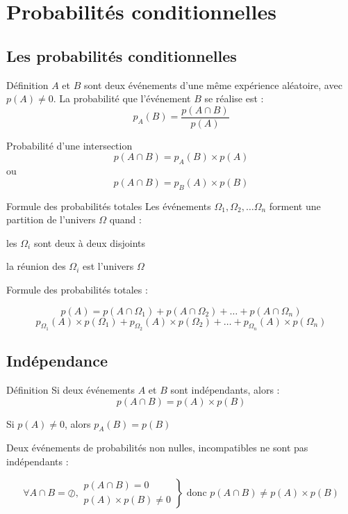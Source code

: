 \section{Probabilités conditionnelles}

\subsection{Les probabilités conditionnelles}
\begin{bclogo}{Définition}
$A$ et $B$ sont deux événements d'une même expérience aléatoire, avec $p(A)\neq 0$. La probabilité que l'événement $B$ se réalise est : \[p_A(B)=\frac{p(A\cap B)}{p(A)}\]
\end{bclogo}

\medskip

\begin{bclogo}{Probabilité d'une intersection}
\[p(A\cap B)=p_A(B)\times p(A)\]
ou
\[p(A\cap B)=p_B(A)\times p(B)\]
\end{bclogo}

\medskip

\begin{bclogo}{Formule des probabilités totales}
Les événements $\Omega_1, \Omega_2,\ldots\Omega_n$ forment une partition de l'univers $\Omega$ quand :

les $\Omega_i$ sont deux à deux disjoints

la réunion des $\Omega_i$ est l'univers $\Omega$

Formule des probabilités totales :

\[p(A)=p(A\cap \Omega_1)+p(A\cap \Omega_2)+\ldots+p(A\cap \Omega_n)\]
\[p_{\Omega_1}(A)\times p(\Omega_1)+p_{\Omega_2}(A)\times p(\Omega_2)+\ldots+p_{\Omega_n}(A)\times p(\Omega_n)\]
\end{bclogo} 

\subsection{Indépendance}

\begin{bclogo}{Définition}
Si deux événements $A$ et $B$ sont indépendants, alors :\[p(A\cap B)=p(A)\times p(B)\]

Si $p(A)\neq 0$, alors $p_A(B)=p(B)$

Deux événements de probabilités non nulles, incompatibles ne sont pas indépendants :

\[\forall A\cap B =\oslash, \left. \begin{array}{l} p(A\cap B)=0\\ p(A)\times p(B)\neq 0\end{array}\right\} \text{ donc } p(A\cap B) \neq p(A)\times p(B)\]
\end{bclogo}

